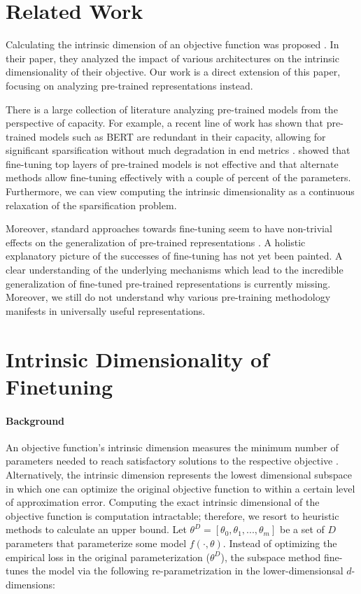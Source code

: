 \section{Related Work} Calculating the intrinsic dimension of an objective function was proposed \cite{intrinsic_dimension}. In their paper, they analyzed the impact of various architectures on the intrinsic dimensionality of their objective. Our work is a direct extension of this paper, focusing on analyzing pre-trained representations instead.

There is a large collection of literature analyzing pre-trained models from the perspective of capacity. For example, a recent line of work has shown that pre-trained models such as BERT are redundant in their capacity, allowing for significant sparsification without much degradation in end metrics \citep{bert_lottery_ticket, bert_lottery_all_winners, hongyuan_lotter_ticket}. \cite{adapter_network} showed that fine-tuning top layers of pre-trained models is not effective and that alternate methods allow fine-tuning effectively with a couple of percent of the parameters. Furthermore, we can view computing the intrinsic dimensionality as a continuous relaxation of the sparsification problem.

Moreover, standard approaches towards fine-tuning seem to have non-trivial effects on the generalization of pre-trained representations \citep{RXF}. A holistic explanatory picture of the successes of fine-tuning has not yet been painted. A clear understanding of the underlying mechanisms which lead to the incredible generalization of fine-tuned pre-trained representations is currently missing. Moreover, we still do not understand why various pre-training methodology manifests in universally useful representations.

\section{Intrinsic Dimensionality of Finetuning}

\paragraph{Background}
An objective function's intrinsic dimension measures the minimum number of parameters needed to reach satisfactory solutions to the respective objective \citep{intrinsic_dimension}. Alternatively, the intrinsic dimension represents the lowest dimensional subspace in which one can optimize the original objective function to within a certain level of approximation error. Computing the exact intrinsic dimensional of the objective function is computation intractable; therefore, we resort to heuristic methods to calculate an upper bound. Let $\theta^{D}=\left[\theta_0, \theta_1,..., \theta_m\right]$ be a set of $D$ parameters that parameterize some model $f(\cdot, \theta)$. Instead of optimizing the empirical loss in the original parameterization ($\theta^{D}$), the subspace method fine-tunes the model via the following re-parametrization in the lower-dimensionsal $d$-dimensions:

